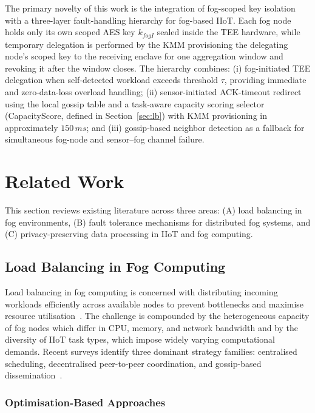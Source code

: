 \documentclass[conference]{IEEEtran}
\begin{document}
    The primary novelty of this work is the integration of fog-scoped key
    isolation with a three-layer fault-handling hierarchy for fog-based
    IIoT. Each fog node holds only its own scoped AES key $k_{fogI}$ sealed
    inside the TEE hardware, while temporary delegation is performed by the KMM
    provisioning the delegating node's scoped key to the receiving enclave
    for one aggregation window and revoking it after the window closes. The
    hierarchy combines: (i) fog-initiated TEE delegation when self-detected
    workload exceeds threshold $\tau$, providing immediate and zero-data-loss
    overload handling; (ii) sensor-initiated ACK-timeout redirect using the
    local gossip table and a task-aware capacity scoring selector (CapacityScore,
    defined in Section~\ref{sec:lb}) with KMM provisioning in approximately
    $150\,ms$; and (iii) gossip-based neighbor detection as a fallback for
    simultaneous fog-node and sensor--fog channel failure.

       \section{Related Work}

This section reviews existing literature across three areas: (A) load balancing in fog environments, (B) fault tolerance mechanisms for distributed fog systems, and (C) privacy-preserving data processing in IIoT and fog computing.

\subsection{Load Balancing in Fog Computing}

Load balancing in fog computing is concerned with distributing incoming workloads efficiently across available nodes to prevent bottlenecks and maximise resource utilisation~\cite{kashani2023}. The challenge is compounded by the heterogeneous capacity of fog nodes which differ in CPU, memory, and network bandwidth and by the diversity of IIoT task types, which impose widely varying computational demands. Recent surveys identify three dominant strategy families: centralised scheduling, decentralised peer-to-peer coordination, and gossip-based dissemination~\cite{vijarania2025,nemati2024}.

\subsubsection{Optimisation-Based Approaches}
\end{document}
